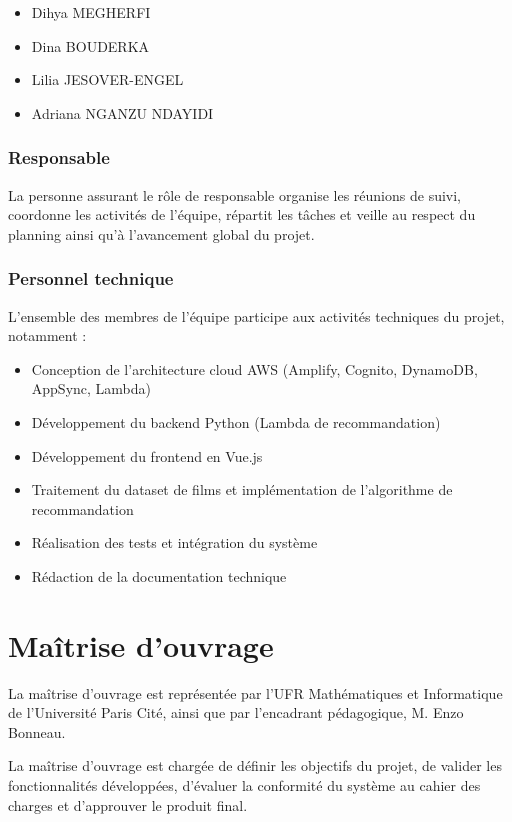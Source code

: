 \documentclass[a4paper,12pt]{report}
\begin{document}
\begin{itemize}
\item Dihya MEGHERFI
\item Dina BOUDERKA
\item Lilia JESOVER-ENGEL
\item Adriana NGANZU NDAYIDI
\end{itemize}

\subsubsection{Responsable}

La personne assurant le rôle de responsable organise les réunions de suivi, 
coordonne les activités de l’équipe, répartit les tâches et veille au respect 
du planning ainsi qu’à l’avancement global du projet.

\subsubsection{Personnel technique}

L’ensemble des membres de l’équipe participe aux activités techniques du projet, 
notamment :

\begin{itemize}
\item Conception de l’architecture cloud AWS (Amplify, Cognito, DynamoDB, AppSync, Lambda)
\item Développement du backend Python (Lambda de recommandation)
\item Développement du frontend en Vue.js
\item Traitement du dataset de films et implémentation de l’algorithme de recommandation
\item Réalisation des tests et intégration du système
\item Rédaction de la documentation technique
\end{itemize}

\section{Maîtrise d'ouvrage}

La maîtrise d'ouvrage est représentée par l’UFR Mathématiques et Informatique 
de l’Université Paris Cité, ainsi que par l’encadrant pédagogique, 
M. Enzo Bonneau.

La maîtrise d’ouvrage est chargée de définir les objectifs du projet, de valider 
les fonctionnalités développées, d’évaluer la conformité du système au cahier 
des charges et d’approuver le produit final.
\end{document}
